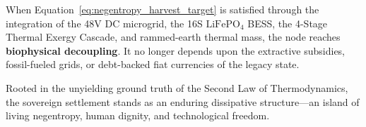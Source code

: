 When Equation~\eqref{eq:negentropy_harvest_target} is satisfied through the integration of the 48V DC microgrid, the 16S $\mathrm{LiFePO}_4$ BESS, the 4-Stage Thermal Exergy Cascade, and rammed-earth thermal mass, the node reaches \textbf{biophysical decoupling}. It no longer depends upon the extractive subsidies, fossil-fueled grids, or debt-backed fiat currencies of the legacy state. 

Rooted in the unyielding ground truth of the Second Law of Thermodynamics, the sovereign settlement stands as an enduring dissipative structure---an island of living negentropy, human dignity, and technological freedom.
